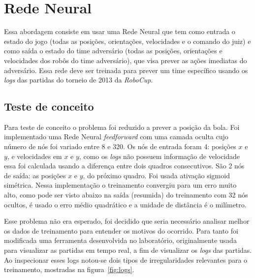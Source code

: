 \section{Rede Neural}\label{cap:abordagem_rede_neural}

Essa abordagem consiste em usar uma Rede Neural que tem como entrada o estado do
jogo (todas as posições, orientações, velocidades e o comando do juiz) e como
saída o estado do time adversário (todas as posições, orientações e velocidades
dos robôs do time adversário), que visa prever as ações imediatas do adversário.
Essa rede deve ser treinada para prever um time específico usando os
\textit{logs} das partidas do torneio de 2013 da \textit{RoboCup}.

\subsection{Teste de conceito}

Para teste de conceito o problema foi reduzido a prever a posição da bola. Foi
implementado uma Rede Neural \textit{feedforward} com uma camada oculta cujo
número de nós foi variado entre 8 e 320. Os nós de entrada foram 4: posições $x$
e $y$, e velocidades em $x$ e $y$, como os \textit{logs} não possuem informação
de velocidade essa foi calculada usando a diferença entre dois quadros
consecutivos. São 2 nós de saída: as posições $x$ e $y$, do próximo quadro. Foi
usada ativação sigmoid simétrica. Nessa implementação o treinamento convergiu
para um erro muito alto, como pode ser visto abaixo na saída (resumida) do
treinamento com 32 nós ocultos, é usado o erro médio quadrático e a unidade de
distância é o milímetro.



Esse problema não era esperado, foi decidido que seria necessário analisar
melhor os dados de treinamento para entender os motivos do ocorrido. Para tanto
foi modificada uma ferramenta desenvolvida no laboratório, originalmente usada
para visualizar as partidas em tempo real, a fim de visualizar os \textit{logs}
das partidas. Ao inspecionar esses logs notou-se dois tipos de irregularidades
relevantes para o treinamento, mostradas na figura~\ref{fig:logs}.



